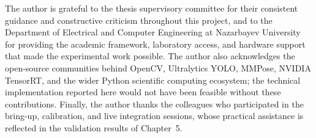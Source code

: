 
The author is grateful to the thesis supervisory committee for their consistent guidance and constructive criticism throughout this project, and to the Department of Electrical and Computer Engineering at Nazarbayev University for providing the academic framework, laboratory access, and hardware support that made the experimental work possible. The author also acknowledges the open-source communities behind OpenCV, Ultralytics YOLO, MMPose, NVIDIA TensorRT, and the wider Python scientific computing ecosystem; the technical implementation reported here would not have been feasible without these contributions. Finally, the author thanks the colleagues who participated in the bring-up, calibration, and live integration sessions, whose practical assistance is reflected in the validation results of Chapter~5.
